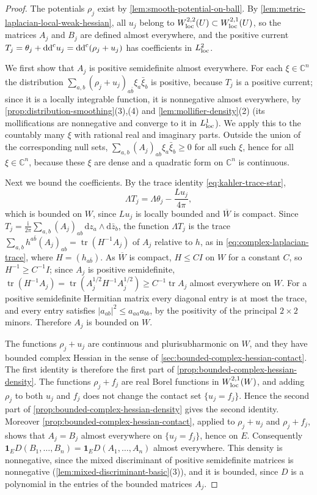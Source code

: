 \begin{proof}
The potentials $\rho_j$ exist by \cref{lem:smooth-potential-on-ball}. By \cref{lem:metric-laplacian-local-weak-hessian}, all $u_j$ belong to $W^{2,2}_{\mathrm{loc}}(U)\subset W^{2,1}_{\mathrm{loc}}(U)$, so the matrices $A_j$ and $B_j$ are defined almost everywhere, and the positive current $T_j=\theta_j+\mathrm{dd}^{\mathrm{c}} u_j=\mathrm{dd}^{\mathrm{c}}(\rho_j+u_j)$ has coefficients in $L^2_{\mathrm{loc}}$.

We first show that $A_j$ is positive semidefinite almost everywhere. For each $\xi\in\mathbb C^n$ the distribution $\sum_{a,b}(\rho_j+u_j)_{a\bar b}\xi_a\bar\xi_b$ is positive, because $T_j$ is a positive current; since it is a locally integrable function, it is nonnegative almost everywhere, by \cref{prop:distribution-smoothing}(3),(4) and \cref{lem:mollifier-density}(2) (its mollifications are nonnegative and converge to it in $L^1_{\mathrm{loc}}$). We apply this to the countably many $\xi$ with rational real and imaginary parts. Outside the union of the corresponding null sets, $\sum_{a,b}(A_j)_{ab}\xi_a\bar\xi_b\geq0$ for all such $\xi$, hence for all $\xi\in\mathbb C^n$, because these $\xi$ are dense and a quadratic form on $\mathbb C^n$ is continuous.

Next we bound the coefficients. By the trace identity \eqref{eq:kahler-trace-star},
\[
 \Lambda T_j=\Lambda\theta_j-\frac{Lu_j}{4\pi},
\]
which is bounded on $W$, since $Lu_j$ is locally bounded and $\overline W$ is compact. Since $T_j=\frac{\mathrm i}{2\pi}\sum_{a,b}(A_j)_{ab}\,\mathrm dz_a\wedge\mathrm d\bar z_b$, the function $\Lambda T_j$ is the trace $\sum_{a,b}h^{a\bar b}(A_j)_{ab}=\operatorname{tr}(H^{-1}A_j)$ of $A_j$ relative to $h$, as in \eqref{eq:complex-laplacian-trace}, where $H=(h_{a\bar b})$. As $\overline W$ is compact, $H\leq CI$ on $W$ for a constant $C$, so $H^{-1}\geq C^{-1}I$; since $A_j$ is positive semidefinite, $\operatorname{tr}(H^{-1}A_j)=\operatorname{tr}(A_j^{1/2}H^{-1}A_j^{1/2})\geq C^{-1}\operatorname{tr}A_j$ almost everywhere on $W$. For a positive semidefinite Hermitian matrix every diagonal entry is at most the trace, and every entry satisfies $|a_{ab}|^2\leq a_{aa}a_{bb}$, by the positivity of the principal $2\times2$ minors. Therefore $A_j$ is bounded on $W$.

The functions $\rho_j+u_j$ are continuous and plurisubharmonic on $W$, and they have bounded complex Hessian in the sense of \cref{sec:bounded-complex-hessian-contact}. The first identity is therefore the first part of \cref{prop:bounded-complex-hessian-density}. The functions $\rho_j+f_j$ are real Borel functions in $W^{2,1}_{\mathrm{loc}}(W)$, and adding $\rho_j$ to both $u_j$ and $f_j$ does not change the contact set $\{u_j=f_j\}$. Hence the second part of \cref{prop:bounded-complex-hessian-density} gives the second identity. Moreover \cref{prop:bounded-complex-hessian-contact}, applied to $\rho_j+u_j$ and $\rho_j+f_j$, shows that $A_j=B_j$ almost everywhere on $\{u_j=f_j\}$, hence on $E$. Consequently $\mathbf1_ED(B_1,\ldots,B_n)=\mathbf1_ED(A_1,\ldots,A_n)$ almost everywhere. This density is nonnegative, since the mixed discriminant of positive semidefinite matrices is nonnegative (\cref{lem:mixed-discriminant-basic}(3)), and it is bounded, since $D$ is a polynomial in the entries of the bounded matrices $A_j$.
\end{proof}


